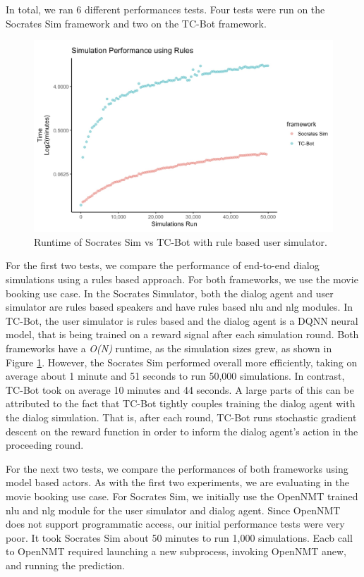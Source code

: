 In total, we ran 6 different performances tests. Four tests were run on the Socrates Sim framework and two on the TC-Bot framework. 
\begin{figure}[h!]
	\centering
	\label{fig:rules_test}
	\includegraphics[width=\linewidth]{diagrams/rules_perf_test.jpeg}
	\caption{ Runtime of Socrates Sim vs TC-Bot with rule based user simulator.}
\end{figure}

For the first two tests, we compare the performance of end-to-end dialog simulations using a rules based approach. For both frameworks, we use the movie booking use case. In the Socrates Simulator, both the dialog agent and user simulator are rules based speakers and have rules based nlu and nlg modules. In TC-Bot, the user simulator is rules based and the dialog agent is a DQNN neural model, that is being trained on a reward signal after each simulation round.  Both frameworks have a \textit{O(N)} runtime, as the simulation sizes grew, as shown in Figure \ref{fig:rules_test}. However, the Socrates Sim performed overall more efficiently, taking on average about 1 minute and 51 seconds to run 50,000 simulations. In contrast, TC-Bot took on average 10 minutes and 44 seconds. A large parts of this can be attributed to the fact that TC-Bot tightly couples training the dialog agent with the dialog simulation. That is, after each round, TC-Bot runs stochastic gradient descent on the reward function in order to inform the dialog agent's action in the proceeding round. 

For the next two tests, we compare the performances of both frameworks using model based actors. As with the first two experiments, we are evaluating in the movie booking use case. For Socrates Sim, we initially use the OpenNMT trained nlu and nlg module for the user simulator and dialog agent. Since OpenNMT does not support programmatic access, our initial performance tests were very poor. It took Socrates Sim about 50 minutes to run 1,000 simulations. Eacb call to OpenNMT required launching a new subprocess, invoking OpenNMT anew, and running the prediction. 

